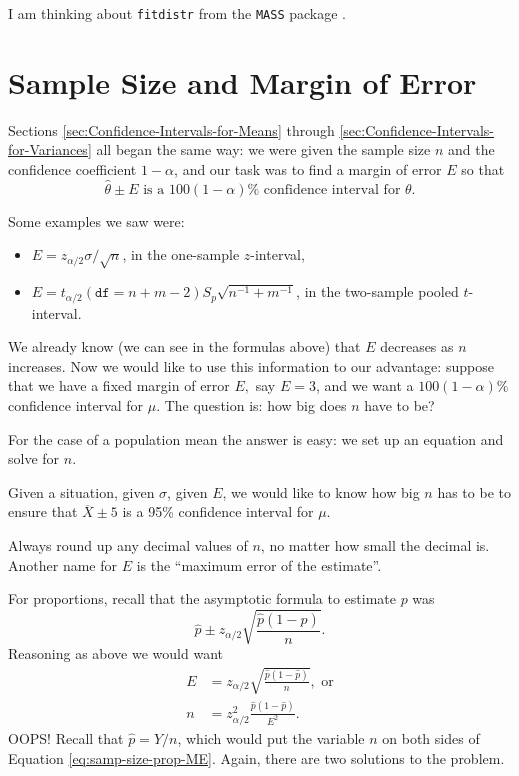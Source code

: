 \documentclass[captions=tableheading]{scrbook}
\begin{document}
I am thinking about \texttt{fitdistr} from the \texttt{MASS} package \cite{Venables2002}.
\section{Sample Size and Margin of Error}
\label{sec-9-7}

\label{sec:Sample-Size-and-MOE}

Sections \ref{sec:Confidence-Intervals-for-Means} through \ref{sec:Confidence-Intervals-for-Variances} all began the same way: we were given the sample size \(n\) and the confidence coefficient \(1-\alpha\), and our task was to find a margin of error \(E\) so that 
\[
\hat{\theta}\pm E\mbox{ is a }100(1-\alpha)\%\mbox{ confidence interval for }\theta.
\]

Some examples we saw were:
\begin{itemize}
\item \(E=z_{\alpha/2}\sigma/\sqrt{n}\), in the one-sample \(z\)-interval,
\item \(E=t_{\alpha/2}(\mathtt{df}=n+m-2)S_{p}\sqrt{n^{-1}+m^{-1}}\), in the two-sample pooled \(t\)-interval.
\end{itemize}

We already know (we can see in the formulas above) that \(E\) decreases as \(n\) increases. Now we would like to use this information to our advantage: suppose that we have a fixed margin of error \(E,\) say \(E=3\), and we want a \(100(1-\alpha)\%\) confidence interval for \(\mu\). The question is: how big does \(n\) have to be?

For the case of a population mean the answer is easy: we set up an equation and solve for \(n\).

\begin{example}
Given a situation, given \(\sigma\), given \(E\), we would like to know how big \(n\) has to be to ensure that \(\overline{X}\pm5\) is a 95\% confidence interval for \(\mu\).
\end{example}

\begin{rem}
Always round up any decimal values of \(n\), no matter how small the decimal is. Another name for \(E\) is the ``maximum error of the estimate''.
\end{rem}

For proportions, recall that the asymptotic formula to estimate \(p\) was
\[
\hat{p}\pm z_{\alpha/2}\sqrt{\frac{\hat{p}(1-\hat{p})}{n}}.
\]
Reasoning as above we would want
\begin{align}
E & =z_{\alpha/2}\sqrt{\frac{\hat{p}(1-\hat{p})}{n}},\mbox{ or}\\
n & =z_{\alpha/2}^{2}\frac{\hat{p}(1-\hat{p})}{E^{2}}.\label{eq:samp-size-prop-ME}
\end{align}
OOPS! Recall that \(\hat{p}=Y/n\), which would put the variable \(n\) on both sides of Equation \ref{eq:samp-size-prop-ME}. Again, there are two solutions to the problem.
\end{document}
